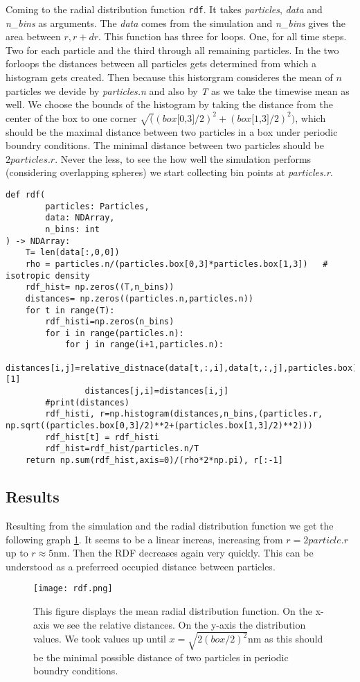 \documentclass{article}[a4paper]
\begin{document}
Coming to the radial distribution function \texttt{rdf}. 
It takes \textit{particles}, \textit{data} and \textit{n\_bins} as arguments. 
The \textit{data} comes from the simulation and \textit{n\_bins} gives the area between $r, r+dr$. 
This function has three for loops. 
One, for all time steps. 
Two for each particle and the third through all remaining particles.
In the two forloops the distances between all particles gets determined from which a histogram gets created. 
Then because this historgram consideres the mean of $n$ particles we devide by \textit{particles.n} and also by \textit{T} as we take the timewise mean as well. 
We choose the bounds of the histogram by taking the distance from the center of the box to one corner $\sqrt((\textit{box[0,3]}/2)^2+(\textit{box[1,3]}/2)^2)$, which should be the maximal distance between two particles in a box under periodic boundry conditions.
The minimal distance between two particles should be $2\textit{particles.r}$.
Never the less, to see the how well the simulation performs (considering overlapping spheres) we start collecting bin points at \textit{particles.r}.

\begin{lstlisting}
def rdf(
        particles: Particles,
        data: NDArray,
        n_bins: int
) -> NDArray:
    T= len(data[:,0,0])
    rho = particles.n/(particles.box[0,3]*particles.box[1,3])   # isotropic density
    rdf_hist= np.zeros((T,n_bins))
    distances= np.zeros((particles.n,particles.n))
    for t in range(T):
        rdf_histi=np.zeros(n_bins)
        for i in range(particles.n):
            for j in range(i+1,particles.n):
                distances[i,j]=relative_distnace(data[t,:,i],data[t,:,j],particles.box)[1]
                distances[j,i]=distances[i,j]
        #print(distances)
        rdf_histi, r=np.histogram(distances,n_bins,(particles.r, np.sqrt((particles.box[0,3]/2)**2+(particles.box[1,3]/2)**2)))
        rdf_hist[t] = rdf_histi
        rdf_hist=rdf_hist/particles.n/T
    return np.sum(rdf_hist,axis=0)/(rho*2*np.pi), r[:-1]
\end{lstlisting}

\subsection{Results}
Resulting from the simulation and the radial distribution function we get the following graph \ref{fig:rdf}.
It seems to be a linear increas, increasing from $r=2particle.r$ up to $r\approx5$nm. Then the RDF decreases again very quickly. This can be understood as a preferreed occupied distance between particles. 
\begin{figure}[h!]
    \centering
    \texttt{[image: rdf.png]}
    \caption{This figure displays the mean radial distribution function. On the x-axis we see the relative distances. On the y-axis the distribution values. We took values up until $x=\sqrt{2(\textit{box}/2)^2}$nm as this should be the minimal possible distance of two particles in periodic boundry conditions.} \label{fig:rdf}
\end{figure}
\end{document}
